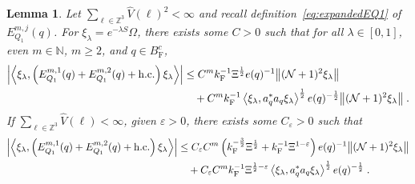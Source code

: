 \documentclass[12pt,a4paper]{article}
\numberwithin{equation}{section}
\newcommand{\NNN}{\mathbb{N}}
\newcommand{\1}{\mathbb{I}}
\newcommand{\F}{\mathrm{F}}
\newcommand{\kF}{k_\F}
\newcommand{\Zstar}{\mathbb{Z}^3} %
\newcommand{\Z}{\mathbb{Z}}
\newcommand{\NN}{\mathcal{N}}
\newcommand{\half}{\frac{1}{2}}
\newcommand{\eva}[1]{\left\langle #1 \right\rangle}
\theoremstyle{plain}
\newtheorem{lemma}[theorem]{Lemma}
\theoremstyle{definition}
\theoremstyle{remark}
\theoremstyle{plain}
\theoremstyle{definition}
\theoremstyle{remark}
\begin{document}
\begin{lemma} \label{lem:EQ111}
Let $ \sum_{\ell \in \Zstar} \hat{V}(\ell)^2 < \infty $ and recall definition~\eqref{eq:expandedEQ1} of $ E_{Q_1}^{m,j}(q) $. For $\xi_\lambda = e^{-\lambda S} \Omega$, there exists some $ C > 0 $ such that for all $ \lambda \in [0,1] $, even $ m \in \NNN $, $ m \ge 2 $, and $ q \in B_{\F}^c $,
\begin{align} \label{eq:estEQ111_Coulomb}
	\abs{\eva{\xi_\lambda,\left(E^{m,1}_{Q_1}(q) + E^{m,2}_{Q_1}(q) + \mathrm{h.c.}\right) \xi_\lambda }} 
	&\leq C^m \kF^{-1} \Xi^{\half} e(q)^{-1}
		\norm{ (\NN+1)^2 \xi_\lambda}  \nonumber\\
	&\quad + C^m \kF^{-1} \eva{\xi_\lambda, a_q^* a_q \xi_\lambda}^{\half} e(q)^{-\half} \norm{(\NN+1)^2 \xi_\lambda} \;.
\end{align}
If $ \sum_{\ell \in \Zstar} \hat{V}(\ell) < \infty $, given $ \varepsilon > 0 $, there exists some $ C_\varepsilon > 0 $ such that
\begin{align} \label{eq:estEQ111}
	\abs{\eva{\xi_\lambda,\left(E^{m,1}_{Q_1}(q) + E^{m,2}_{Q_1}(q) + \mathrm{h.c.}\right) \xi_\lambda }} 
	&\leq C_\varepsilon C^m \left(
		\kF^{-\frac{3}{2}} \Xi^\half
		+ \kF^{-1}\Xi^{1-\varepsilon} \right) e(q)^{-1}
		\norm{ (\NN+1)^2 \xi_\lambda} \nonumber\\
	&\quad + C_\varepsilon C^m \kF^{-1} \Xi^{\half - \varepsilon} \eva{\xi_\lambda, a_q^* a_q \xi_\lambda}^{\half} e(q)^{-\half} \;.
\end{align}
\end{lemma}
\end{document}
